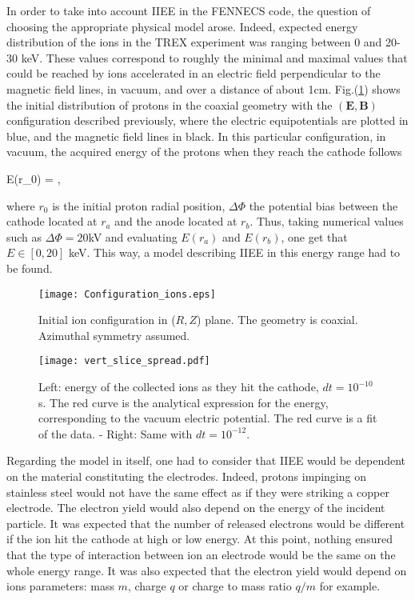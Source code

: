 In order to take into account IIEE in the FENNECS code, the question of choosing the appropriate physical model arose. Indeed, expected energy distribution of the ions in the TREX experiment was ranging between 0 and 20-30 keV. These values correspond to roughly the minimal and maximal values that could be reached by ions accelerated in an electric field perpendicular to the magnetic field lines, in vacuum, and over a distance of about 1cm. Fig.(\ref{Config_ions}) shows the initial distribution of protons in the coaxial geometry with the $(\mathbf{E}, \mathbf{B})$ configuration described previously, where the electric equipotentials are plotted in blue, and the magnetic field lines in black. In this particular configuration, in vacuum, the acquired energy of the protons when they reach the cathode follows 

\beq
E(r_0) = \Delta \Phi {},\label{ions_energy}      
\eeq
 
\noindent where $r_0$ is the initial proton radial position, $\Delta \Phi$ the potential bias between the cathode located at $r_a$ and the anode located at $r_b$. Thus, taking numerical values such as $\Delta \Phi = 20$kV and evaluating $E(r_a)$ and $E(r_b)$, one get that $E\in [0,20]$ keV. This way, a model describing IIEE in this energy range had to be found.\\


\begin{figure}[h!]
\centering
	\texttt{[image: Configuration\_ions.eps]}
	\caption{\label{Config_ions} Initial ion configuration in ($R,Z$) plane. The geometry is coaxial. Azimuthal symmetry assumed.}
\end{figure}



\begin{figure}[h!]
\centering
	\texttt{[image: vert\_slice\_spread.pdf]}
	\caption{\label{vert_spread} Left: energy of the collected ions as they hit the cathode, $dt=10^{-10}$ s. The red curve is the analytical expression for the energy, corresponding to the vacuum electric potential. The red curve is a fit of the data. - Right: Same with $dt=10^{-12}$. }
\end{figure}  



\noindent Regarding the model in itself, one had to consider that IIEE would be dependent on the material constituting the electrodes. Indeed, protons impinging on stainless steel would not have the same effect as if they were striking a copper electrode. The electron yield would also depend on the energy of the incident particle. It was expected that the number of released electrons would be different if the ion hit the cathode at high or low energy. At this point, nothing ensured that the type of interaction between ion an electrode would be the same on the whole energy range. It was also expected that the electron yield would depend on ions parameters: mass $m$, charge $q$ or charge to mass ratio $q/m$ for example. \\

